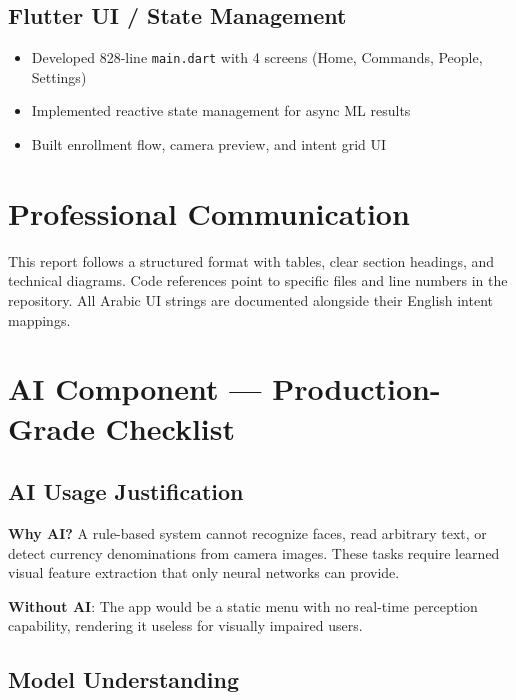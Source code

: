 \documentclass[12pt,a4paper]{article}
\begin{document}
\subsection{Flutter UI / State Management}
\begin{itemize}
  \item Developed 828-line \texttt{main.dart} with 4 screens (Home, Commands, People, Settings)
  \item Implemented reactive state management for async ML results
  \item Built enrollment flow, camera preview, and intent grid UI
\end{itemize}

\section{Professional Communication}
This report follows a structured format with tables, clear section headings, and technical diagrams. Code references point to specific files and line numbers in the repository. All Arabic UI strings are documented alongside their English intent mappings.

\newpage
\section{AI Component --- Production-Grade Checklist}

\subsection{AI Usage Justification}
\begin{tcolorbox}[colback=blue!5]
\textbf{Why AI?} A rule-based system cannot recognize faces, read arbitrary text, or detect currency denominations from camera images. These tasks require learned visual feature extraction that only neural networks can provide.

\textbf{Without AI}: The app would be a static menu with no real-time perception capability, rendering it useless for visually impaired users.
\end{tcolorbox}

\subsection{Model Understanding}
\end{document}
